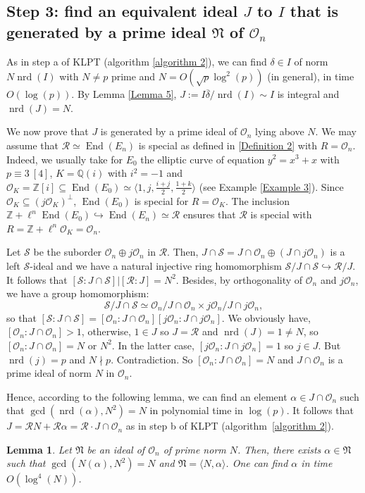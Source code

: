 \documentclass[a4paper,10pt]{report}
\theoremstyle{definition}
\theoremstyle{plain}
\newtheorem{Lemma}[Definition]{Lemma}
\theoremstyle{definition}
\newcommand{\Z}{\mathbb{Z}}
\newcommand{\Q}{\mathbb{Q}}
\newcommand{\m}[1]{\mathcal{#1}}
\newcommand{\mO}{\mathcal{O}}
\renewcommand{\(}{\left(}
\renewcommand{\)}{\right)}
\newcommand{\mf}[1]{\mathfrak{#1}}
\DeclareMathOperator{\End}{End}
\DeclareMathOperator{\nrd}{nrd}
\begin{document}
\subsection{Step 3: find an equivalent ideal $J$ to $I$ that is generated by a prime ideal $\mf{N}$ of $\mO_n$}

As in step a of KLPT (algorithm \ref{algorithm 2}), we can find $\delta\in I$ of norm $N\nrd(I)$ with $N\neq p$ prime and $N=O(\sqrt{p}\log^2(p))$ (in general), in time $O(\log(p))$. By Lemma \ref{Lemma 5}, $J:=I\overline{\delta}/\nrd(I)\sim I$ is integral and $\nrd(J)=N$.

We now prove that $J$ is generated by a prime ideal of $\mO_n$ lying above $N$. We may assume that $\m{R}\simeq\End(E_n)$ is special as defined in \ref{Definition 2} with $R=\mO_n$. Indeed,  we usually take for $E_0$ the elliptic curve of equation $y^2=x^3+x$ with $p\equiv 3 \ [4]$, $K=\Q(i)$ with $i^2=-1$ and $\mO_K=\Z[i]\subseteq \End(E_0)\simeq \langle 1,j, \frac{i+j}{2},\frac{1+k}{2}\rangle$ (see Example \ref{Example 3}). Since $\mO_K\subseteq (j\mO_K)^\bot$, $\End(E_0)$ is special for $R=\mO_K$. The inclusion $\Z+\ell^n\End(E_0)\hookrightarrow \End(E_n)\simeq \m{R}$ ensures that $\m{R}$ is special with $R=\Z+\ell^n\mO_K=\mO_n$.

Let $\m{S}$ be the suborder $\mO_n\oplus j\mO_n$ in $\m{R}$. Then, $J\cap\m{S}=J\cap\mO_n\oplus(J\cap j\mO_n)$ is a left $\m{S}$-ideal and we have a natural injective ring homomorphism $\m{S}/J\cap\m{S}\hookrightarrow \m{R}/J$. It follows that $[\m{S}:J\cap\m{S}]|[\m{R}:J]=N^2$. Besides, by orthogonality of $\mO_n$ and $j\mO_n$, we have a group homomorphism: 
\[\m{S}/J\cap\m{S}\simeq \mO_n/J\cap\mO_n\times j\mO_n/J\cap j\mO_n,\]
so that $[\m{S}:J\cap\m{S}]=[\mO_n:J\cap\mO_n][j\mO_n:J\cap j\mO_n]$. We obviously have, $[\mO_n:J\cap\mO_n]>1$, otherwise, $1\in J$ so $J=\m{R}$ and $\nrd(J)=1\neq N$, so $[\mO_n:J\cap\mO_n]=N$ or $N^2$. In the latter case, $[j\mO_n:J\cap j\mO_n]=1$ so $j\in J$. But $\nrd(j)=p$ and $N\nmid p$. Contradiction.  So $[\mO_n:J\cap\mO_n]=N$ and $J\cap\mO_n$ is a prime ideal of norm $N$ in $\mO_n$.

Hence, according to the following lemma, we can find an element $\alpha\in J\cap \mO_n$ such that $\gcd(\nrd(\alpha),N^2)=N$ in polynomial time in $\log(p)$.  It follows that $J=\m{R}N+\m{R}\alpha=\m{R}\cdot J\cap\mO_n$ as in step b of KLPT (algorithm~\ref{algorithm 2}).

\begin{Lemma}
Let $\mf{N}$ be an ideal of $\mO_n$ of prime norm $N$. Then, there exists $\alpha\in \mf{N}$ such that $\gcd(N(\alpha),N^2)=N$ and $\mf{N}=\langle N,\alpha\rangle$. One can find $\alpha$ in time $O(\log^4(N))$.
\end{Lemma}
\end{document}
